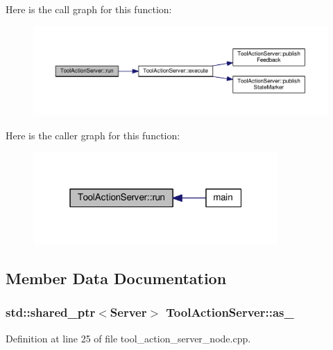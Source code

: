 Here is the call graph for this function\+:
\nopagebreak
\begin{figure}[H]
\begin{center}
\leavevmode
\includegraphics[width=350pt]{classToolActionServer_adbf39061e0f8c74352cbdc695d7d8469_cgraph}
\end{center}
\end{figure}




Here is the caller graph for this function\+:
\nopagebreak
\begin{figure}[H]
\begin{center}
\leavevmode
\includegraphics[width=265pt]{classToolActionServer_adbf39061e0f8c74352cbdc695d7d8469_icgraph}
\end{center}
\end{figure}




\subsection{Member Data Documentation}
\subsubsection[{\texorpdfstring{as\+\_\+}{as_}}]{\setlength{\rightskip}{0pt plus 5cm}std\+::shared\+\_\+ptr$<${\bf Server}$>$ Tool\+Action\+Server\+::as\+\_\+}\hypertarget{classToolActionServer_a2b90828292eb25a69449de1e67a173d6}{}\label{classToolActionServer_a2b90828292eb25a69449de1e67a173d6}


Definition at line 25 of file tool\+\_\+action\+\_\+server\+\_\+node.\+cpp.

